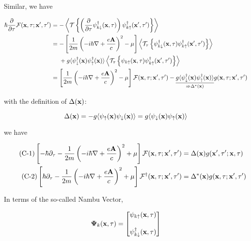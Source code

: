Similar, we have

\[\begin{split}
\hbar\frac{\partial}{\partial\tau}\mathcal{F}({\bf x},\tau;{\bf x'},\tau') &=-\left\langle\mathcal{T}\left\{\left(\frac{\partial}{\partial\tau}\psi_{k\downarrow}^\dagger({\bf x,\tau})\right)\psi_{k\uparrow}^\dagger({\bf x'},\tau')\right\}\right\rangle\\
&=-\left[\frac{1}{2m}\left(-i\hbar\nabla+\frac{e{\bf A}}{c}\right)^2-\mu\right]\left\langle\mathcal{T}_{\tau}\left\{\psi_{k\downarrow}^\dagger({\bf x,\tau})\psi_{k\uparrow}^\dagger({\bf x'},\tau')\right\}\right\rangle \\
&\quad\ + g\langle\psi_\downarrow^\dagger({\bf x})\psi_\uparrow^\dagger({\bf x})\rangle\left\langle\mathcal{T}_{\tau}\left\{\psi_{k\uparrow}({\bf x,\tau})\psi^\dagger_{k\uparrow}({\bf x'},\tau')\right\}\right\rangle\\
&= \left[\frac{1}{2m}\left(-i\hbar\nabla+\frac{e{\bf A}}{c}\right)^2-\mu\right]\mathcal{F}({\bf x},\tau;{\bf x'},\tau') - \underset{\Rightarrow\Delta^*({\bf x})}{\underline{g\langle\psi_\downarrow^\dagger({\bf x})\psi_\uparrow^\dagger({\bf x})\rangle}}g({\bf x},\tau;{\bf x'},\tau')
\end{split}\]

with the definition of $\Delta({\bf x})$:

\[\Delta({\bf x}) = - g\langle\psi_\uparrow({\bf x})\psi_\downarrow({\bf x})\rangle =   g\langle\psi_\downarrow({\bf x})\psi_\uparrow({\bf x})\rangle\]

we have

\begin{align}
\tag{C-1}
\left[-\hbar\partial_\tau-\frac{1}{2m}\left(-i\hbar\nabla+\frac{e{\bf A}}{c}\right)^2+\mu\right]\mathcal{F}({\bf x},\tau;{\bf x'},\tau')  &= \Delta({\bf x})g({\bf x'},\tau';{\bf x},\tau)\\
\tag{C-2}
\left[\hbar\partial_\tau-\frac{1}{2m}\left(-i\hbar\nabla+\frac{e{\bf A}}{c}\right)^2+\mu\right]\mathcal{F}^\dagger({\bf x},\tau;{\bf x'},\tau')  &= \Delta^*({\bf x})g({\bf x},\tau;{\bf x'},\tau')
\end{align}

In terms of the so-called Nambu Vector, 

\[{\bm{\Psi}}_k({\bf x},\tau)=\left[\begin{matrix}\psi_{k\uparrow}({\bf x},\tau)\\ \ \\\psi^\dagger_{k\downarrow}({\bf x},\tau)\end{matrix}\right] \]

